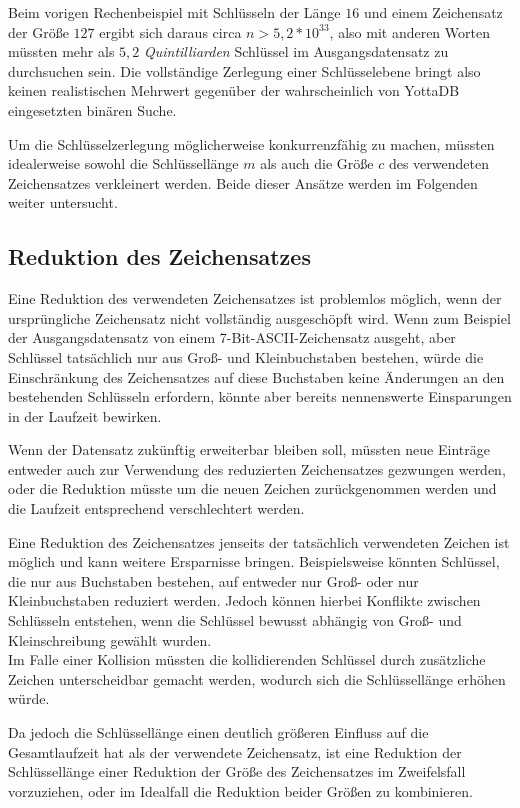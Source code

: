 \documentclass[oneside]{ausarbeitung}
\begin{document}
Beim vorigen Rechenbeispiel mit Schlüsseln der Länge $16$ und einem Zeichensatz der Größe $127$ ergibt sich daraus circa $n > 5,2*10^{33}$, also mit anderen Worten müssten mehr als $5,2$ \textit{Quintilliarden} Schlüssel im Ausgangsdatensatz zu durchsuchen sein. Die vollständige Zerlegung einer Schlüsselebene bringt also keinen realistischen Mehrwert gegenüber der wahrscheinlich von YottaDB eingesetzten binären Suche.

\pagebreak

Um die Schlüsselzerlegung möglicherweise konkurrenzfähig zu machen, müssten idealerweise sowohl die Schlüssellänge $m$ als auch die Größe $c$ des verwendeten Zeichensatzes verkleinert werden. Beide dieser Ansätze werden im Folgenden weiter untersucht.

\subsection{Reduktion des Zeichensatzes}

Eine Reduktion des verwendeten Zeichensatzes ist problemlos möglich, wenn der ursprüngliche Zeichensatz nicht vollständig ausgeschöpft wird. Wenn zum Beispiel der Ausgangsdatensatz von einem 7-Bit-ASCII-Zeichensatz ausgeht, aber Schlüssel tatsächlich nur aus Groß- und Kleinbuchstaben bestehen, würde die Einschränkung des Zeichensatzes auf diese Buchstaben keine Änderungen an den bestehenden Schlüsseln erfordern, könnte aber bereits nennenswerte Einsparungen in der Laufzeit bewirken.

Wenn der Datensatz zukünftig erweiterbar bleiben soll, müssten neue Einträge entweder auch zur Verwendung des reduzierten Zeichensatzes gezwungen werden, oder die Reduktion müsste um die neuen Zeichen zurückgenommen werden und die Laufzeit entsprechend verschlechtert werden. 

Eine Reduktion des Zeichensatzes jenseits der tatsächlich verwendeten Zeichen ist möglich und kann weitere Ersparnisse bringen. Beispielsweise könnten Schlüssel, die nur aus Buchstaben bestehen, auf entweder nur Groß- oder nur Kleinbuchstaben reduziert werden. Jedoch können hierbei Konflikte zwischen Schlüsseln entstehen, wenn die Schlüssel bewusst abhängig von Groß- und Kleinschreibung gewählt wurden. \\
Im Falle einer Kollision müssten die kollidierenden Schlüssel durch zusätzliche Zeichen unterscheidbar gemacht werden, wodurch sich die Schlüssellänge erhöhen würde.

Da jedoch die Schlüssellänge einen deutlich größeren Einfluss auf die Gesamtlaufzeit hat als der verwendete Zeichensatz, ist eine Reduktion der Schlüssellänge einer Reduktion der Größe des Zeichensatzes im Zweifelsfall vorzuziehen, oder im Idealfall die Reduktion beider Größen zu kombinieren.
\end{document}
